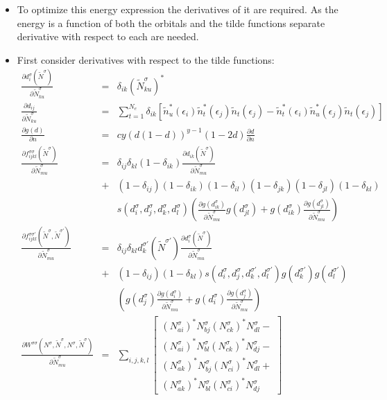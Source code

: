 \documentclass[aip,graphicx]{revtex4-1}
\newcommand{\nNq}[1]{N^{#1}}
\newcommand{\nNs}{\nNq{\sigma}}
\newcommand{\nNsd}[1]{\left(\nNq{\sigma}_{#1}\right)^{*}}
\newcommand{\tNq}[1]{\tilde{N}^{#1}}
\newcommand{\tNs}{\tNq{\sigma}}
\newcommand{\tNt}{\tNq{\sigma'}}
\newcommand{\tNsd}[1]{\left(\tNq{\sigma}_{#1}\right)^{*}}
\newcommand{\dq}[2]{d_{#1}^{#2}}
\newcommand{\ds}[1]{\dq{#1}{\sigma}}
\newcommand{\dt}[1]{\dq{#1}{\sigma'}}
\newcommand{\Wqq}[2]{W^{#1 #2}}
\newcommand{\Wss}{\Wqq{\sigma}{\sigma}}
\begin{document}
\begin{itemize}
\item To optimize this energy expression the derivatives of it are required. As the energy is a function of both 
      the orbitals and the tilde functions separate derivative with respect to each are needed.
\item First consider derivatives with respect to the tilde functions:
      \begin{eqnarray}
      \frac{\partial\ds{i}(\tNs)}{\partial\tNs_{ku}} &=& \delta_{ik}\tNsd{ku} \\
      \frac{\partial d_{ij}}{\partial\tNs_{ku}} &=& \sum_{t=1}^{N_e}\delta_{ik}\left[
      \tilde{n}_u^*(\epsilon_i)\tilde{n}_t^*(\epsilon_j)\tilde{n}_t(\epsilon_j)-
      \tilde{n}_t^*(\epsilon_i)\tilde{n}_u^*(\epsilon_j)\tilde{n}_t(\epsilon_j)
      \right] \\
      \frac{\partial g(d)}{\partial n} &=& cy(d(1-d))^{y-1}\left(1-2d\right)\frac{\partial d}{\partial n} \\ 
      \frac{\partial f^{\sigma\sigma}_{ijkl}(\tNs)}{\partial\tNs_{mu}}
      &=& \delta_{ij}\delta_{kl}(1-\delta_{ik})\frac{\partial d_{ik}(\tNs)}{\partial \tNs_{mu}} \nonumber \\
      &+& (1-\delta_{ij})(1-\delta_{ik})(1-\delta_{il})(1-\delta_{jk})(1-\delta_{jl})(1-\delta_{kl}) \nonumber \\
      && s(\ds{i},\ds{j},\ds{k},\ds{l}) 
         \left(\frac{\partial g(\ds{ik})}{\partial \tNs_{mu}}g(\ds{jl})+g(\ds{ik})\frac{\partial g(\ds{jl})}{\partial \tNs_{mu}}\right) \\
      \frac{\partial f^{\sigma\sigma'}_{ijkl}(\tNs,\tNt)}{\partial\tNs_{mu}} 
      &=& \delta_{ij}\delta_{kl}\dt{k}(\tNt)\frac{\partial\ds{i}(\tNs)}{\partial\tNs_{mu}} \nonumber \\
      &+& (1-\delta_{ij})(1-\delta_{kl}) s(\ds{i},\ds{j},\dt{k},\dt{l})  g(\dt{k}) g(\dt{l}) \nonumber \\
      && \left(g(\ds{j}) \frac{\partial g(\ds{i})}{\partial\tNs_{mu}} + g(\ds{i}) \frac{\partial g(\ds{j})}{\partial\tNs_{mu}}\right) \\
      \frac{\partial \Wss(\nNs,\tNs,\nNs,\tNs)}{\partial\tNs_{mu}}
      &=& \sum_{i,j,k,l} \left[\begin{array}{c}
      \nNsd{ai}\nNs_{bj}\nNsd{ck}\nNs_{dl} - \\
      \nNsd{ai}\nNs_{bl}\nNsd{ck}\nNs_{dj} - \\
      \nNsd{ak}\nNs_{bj}\nNsd{ci}\nNs_{dl} + \\
      \nNsd{ak}\nNs_{bl}\nNsd{ci}\nNs_{dj}
      \end{array}\right] 

\end{eqnarray}
\end{itemize}
\end{document}
